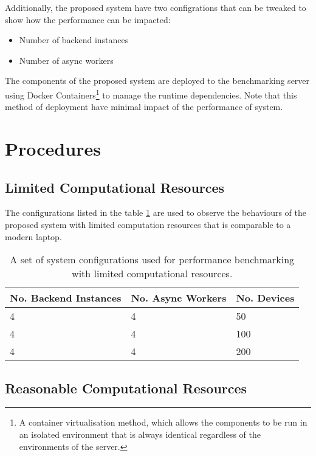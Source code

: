 \documentclass[../thesis.tex]{subfiles}
\begin{document}
Additionally, the proposed system have two configrations that can be tweaked to show how the performance can be impacted:

\begin{itemize}
	\item Number of backend instances
	\item Number of async workers
\end{itemize}

The components of the proposed system are deployed to the benchmarking server using Docker Containers\footnote{A container virtualisation method, which allows the components to be run in an isolated environment that is always identical regardless of the environments of the server.} to manage the runtime dependencies. Note that this method of deployment have minimal impact of the performance of system. 

\section{Procedures}

\subsection{Limited Computational Resources}
The configurations listed in the table \ref{tab:lowsysconfbench} are used to observe the behaviours of the proposed system with limited computation resources that is comparable to a modern laptop.

\begin{table}[h!]
	\begin{center}
		\caption{A set of system configurations used for performance benchmarking with limited computational resources.}
		\label{tab:lowsysconfbench}
		\begin{tabular}{l|l|l}
			\toprule
			\textbf{No. Backend Instances} & \textbf{No. Async Workers} & \textbf{No. Devices}\\
			\midrule
			4 & 4 & 50\\
			4 & 4 & 100\\
			4 & 4 & 200\\
			\bottomrule
		\end{tabular}
	\end{center}
\end{table}

\subsection{Reasonable Computational Resources}
\end{document}
